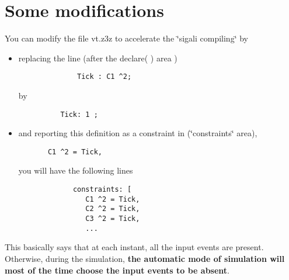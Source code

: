\section{Some modifications}\label{note}
You can modify the file vt.z3z to accelerate the \char`\"{}sigali compiling\char`\"{} by\begin{itemize}
\item replacing the line (after the declare( ) area ) 

\footnotesize\begin{verbatim}              Tick : C1 ^2;
        \end{verbatim}
\normalsize
 by 

\footnotesize\begin{verbatim}	       Tick: 1 ;
        \end{verbatim}
\normalsize
\end{itemize}


\begin{itemize}
\item and reporting this definition as a constraint in (\char`\"{}constraints\char`\"{} area), 

\footnotesize\begin{verbatim}	    C1 ^2 = Tick,
        \end{verbatim}
\normalsize
 you will have the following lines 

\footnotesize\begin{verbatim}             constraints: [
                C1 ^2 = Tick,
                C2 ^2 = Tick,
                C3 ^2 = Tick,
                ...
        \end{verbatim}
\normalsize
\end{itemize}


This basically says that at each instant, all the input events are present. Otherwise, during the simulation, {\bf  the automatic mode of simulation will most of the time choose the input events to be absent}. 